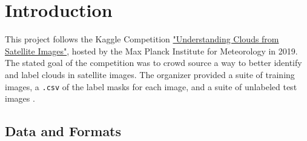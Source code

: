 \section{Introduction}
This project follows the Kaggle Competition \href{https://www.kaggle.com/competitions/understanding_cloud_organization/overview}{"Understanding Clouds from Satellite Images"}, hosted by the Max Planck Institute for Meteorology in 2019. The stated goal of the competition was to crowd source a way to better identify and label clouds in satellite images. The organizer provided a suite of training images, a \texttt{.csv} of the label masks for each image, and a suite of unlabeled test images \cite{fouhey_2010MachineLearning_2018}. 

\subsection{Data and Formats}